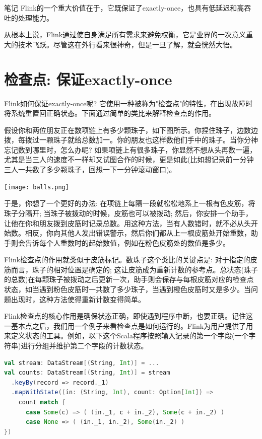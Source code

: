 \documentclass[oneside]{ctexbook}
\begin{document}
\begin{bclogo}[logo=\bcinfo, couleurBarre=orange, noborder=true, couleur=white]{笔记}
Flink的一个重大价值在于，它既保证了exactly-once，也具有低延迟和高吞吐的处理能力。
\end{bclogo}

从根本上说，Flink通过使自身满足所有需求来避免权衡，它是业界的一次意义重大的技术飞跃。尽管这在外行看来很神奇，但是一旦了解，就会恍然大悟。

\section{检查点: 保证exactly-once}

Flink如何保证exactly-once呢? 它使用一种被称为"检查点"的特性，在出现故障时将系统重置回正确状态。下面通过简单的类比来解释检查点的作用。

假设你和两位朋友正在数项链上有多少颗珠子，如下图所示。你捏住珠子，边数边拨，每拨过一颗珠子就给总数加一。你的朋友也这样数他们手中的珠子。当你分神忘记数到哪里时，怎么办呢? 如果项链上有很多珠子，你显然不想从头再数一遍，尤其是当三人的速度不一样却又试图合作的时候，更是如此(比如想记录前一分钟三人一共数了多少颗珠子，回想一下一分钟滚动窗口)。

\noindent \texttt{[image: balls.png]}

于是，你想了一个更好的办法: 在项链上每隔一段就松松地系上一根有色皮筋，将珠子分隔开; 当珠子被拨动的时候，皮筋也可以被拨动; 然后，你安排一个助手，让他在你和朋友拨到皮筋时记录总数。用这种方法，当有人数错时，就不必从头开始数。相反，你向其他人发出错误警示，然后你们都从上一根皮筋处开始重数，助手则会告诉每个人重数时的起始数值，例如在粉色皮筋处的数值是多少。

Flink检查点的作用就类似于皮筋标记。数珠子这个类比的关键点是: 对于指定的皮筋而言，珠子的相对位置是确定的; 这让皮筋成为重新计数的参考点。总状态(珠子的总数)在每颗珠子被拨动之后更新一次，助手则会保存与每根皮筋对应的检查点状态，如当遇到粉色皮筋时一共数了多少珠子，当遇到橙色皮筋时又是多少。当问题出现时，这种方法使得重新计数变得简单。

Flink检查点的核心作用是确保状态正确，即使遇到程序中断，也要正确。记住这一基本点之后，我们用一个例子来看检查点是如何运行的。Flink为用户提供了用来定义状态的工具。例如，以下这个Scala程序按照输入记录的第一个字段(一个字符串)进行分组并维护第二个字段的计数状态。

\begin{lstlisting}[language=scala]
val stream: DataStream[(String, Int)] = ...
val counts: DataStream[(String, Int)] = stream
  .keyBy(record => record._1)
  .mapWithState((in: (String, Int), count: Option[Int]) =>
    count match {
      case Some(c) => ( (in._1, c + in._2), Some(c + in._2) )
      case None => ( (in._1, in._2), Some(in._2) )
})
\end{lstlisting}
\end{document}
